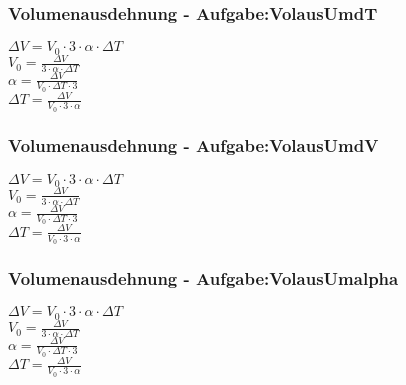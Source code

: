 \subsubsection{Volumenausdehnung - Aufgabe:VolausUmdT} 
\begin{minipage}{0.45\textwidth} 
$ \Delta V = V_{0} \cdot 3\cdot \alpha \cdot \Delta T $\\ 
$ V_{0}  = \frac{  \Delta V}{3\cdot \alpha \cdot \Delta T} $\\ 
$ \alpha  = \frac{  \Delta V}{V_{0} \cdot \Delta T\cdot 3} $\\ 
$ \Delta T = \frac{  \Delta V}{V_{0} \cdot 3\cdot \alpha } $\\ 
\end{minipage} 
\begin{minipage}{0.45\textwidth} 
 
\end{minipage} 
\subsubsection{Volumenausdehnung - Aufgabe:VolausUmdV} 
\begin{minipage}{0.45\textwidth} 
$ \Delta V = V_{0} \cdot 3\cdot \alpha \cdot \Delta T $\\ 
$ V_{0}  = \frac{  \Delta V}{3\cdot \alpha \cdot \Delta T} $\\ 
$ \alpha  = \frac{  \Delta V}{V_{0} \cdot \Delta T\cdot 3} $\\ 
$ \Delta T = \frac{  \Delta V}{V_{0} \cdot 3\cdot \alpha } $\\ 
\end{minipage} 
\begin{minipage}{0.45\textwidth} 
 
\end{minipage} 
\subsubsection{Volumenausdehnung - Aufgabe:VolausUmalpha} 
\begin{minipage}{0.45\textwidth} 
$ \Delta V = V_{0} \cdot 3\cdot \alpha \cdot \Delta T $\\ 
$ V_{0}  = \frac{  \Delta V}{3\cdot \alpha \cdot \Delta T} $\\ 
$ \alpha  = \frac{  \Delta V}{V_{0} \cdot \Delta T\cdot 3} $\\ 
$ \Delta T = \frac{  \Delta V}{V_{0} \cdot 3\cdot \alpha } $\\ 
\end{minipage} 
\begin{minipage}{0.45\textwidth} 
 
\end{minipage} 
